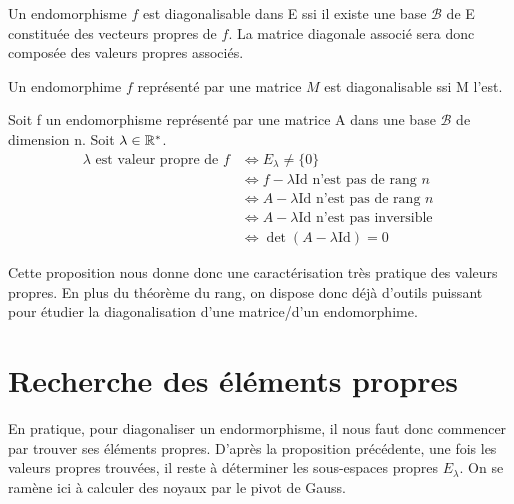 \begin{proposition}
    Un endomorphisme $f$ est diagonalisable dans E ssi il existe une base $\mathcal{B}$ de E 
    constituée des vecteurs propres de $f$. 
    La matrice diagonale associé sera donc composée des valeurs propres associés. 
\end{proposition}

\begin{proposition}
    Un endomorphime $f$ représenté par une matrice $M$ est diagonalisable ssi M l'est. 
\end{proposition}


\begin{proposition}
    Soit f un endomorphisme représenté par une matrice A dans une base $\mathcal{B}$ de dimension n. 
    Soit $ \lambda \in \mathbb{R}^*$. 
    \begin{align*}
        \lambda \text{ est valeur propre de } f & \iff E_\lambda \not = \{ 0 \} \\ 
                                                & \iff f - \lambda \text{Id} \text{ n'est pas de rang } n \\ 
                                                & \iff A - \lambda \text{Id} \text{ n'est pas de rang } n \\ 
                                                & \iff A - \lambda \text{Id} \text{ n'est pas inversible } \\ 
                                                & \iff \det (A - \lambda \text{Id}) = 0 
    \end{align*}
\end{proposition}

Cette proposition nous donne donc une caractérisation très pratique des valeurs propres. 
En plus du théorème du rang, on dispose donc déjà d'outils puissant pour étudier la diagonalisation d'une matrice/d'un endomorphime. 


\section{Recherche des éléments propres}

En pratique, pour diagonaliser un endormorphisme, il nous faut donc commencer par trouver ses éléments propres. 
D'après la proposition précédente, une fois les valeurs propres trouvées, il reste à déterminer les sous-espaces propres $E_\lambda$.
On se ramène ici à calculer des noyaux par le pivot de Gauss. 


